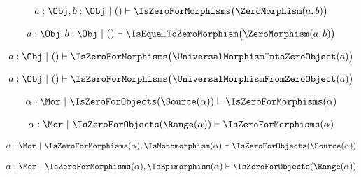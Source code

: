 \begin{sequent}
\begin{align*}
   a: \Obj, b: \Obj ~|~ () \vdash \IsZeroForMorphisms \big( \ZeroMorphism( a, b ) \big)
\end{align*}
\end{sequent}

\begin{sequent}
\begin{align*}
   a: \Obj, b: \Obj ~|~ () \vdash \IsEqualToZeroMorphism \big( \ZeroMorphism( a, b ) \big)
\end{align*}
\end{sequent}

\begin{sequent}
\begin{align*}
   a: \Obj ~|~ () \vdash \IsZeroForMorphisms \big( \UniversalMorphismIntoZeroObject( a ) \big)
\end{align*}
\end{sequent}

\begin{sequent}
\begin{align*}
   a: \Obj ~|~ () \vdash \IsZeroForMorphisms \big( \UniversalMorphismFromZeroObject( a ) \big)
\end{align*}
\end{sequent}

\begin{sequent}
\begin{align*}
   \alpha: \Mor ~|~ \IsZeroForObjects(\Source(\alpha)) \vdash \IsZeroForMorphisms(\alpha)
\end{align*}
\end{sequent}

\begin{sequent}
\begin{align*}
   \alpha: \Mor ~|~ \IsZeroForObjects(\Range(\alpha)) \vdash \IsZeroForMorphisms(\alpha)
\end{align*}
\end{sequent}

\begin{sequent}
\begin{align*}
   \alpha: \Mor ~|~ \IsZeroForMorphisms(\alpha), \IsMonomorphism(\alpha) \vdash \IsZeroForObjects(\Source(\alpha))
\end{align*}
\end{sequent}

\begin{sequent}
\begin{align*}
   \alpha: \Mor ~|~ \IsZeroForMorphisms(\alpha), \IsEpimorphism(\alpha) \vdash \IsZeroForObjects(\Range(\alpha))
\end{align*}
\end{sequent}

